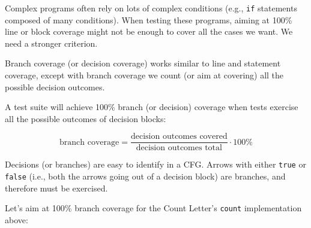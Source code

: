 Complex programs often rely on lots of complex conditions (e.g.,
\texttt{if} statements composed of many conditions). When testing these
programs, aiming at 100\% line or block coverage might not be enough to
cover all the cases we want. We need a stronger criterion.

Branch coverage (or decision coverage) works similar to line and
statement coverage, except with branch coverage we count (or aim at
covering) all the possible decision outcomes.

A test suite will achieve 100\% branch (or decision) coverage when tests
exercise all the possible outcomes of decision blocks:

\[\text{branch coverage} = \frac{\text{decision outcomes covered}}{\text{decision outcomes total}} \cdot 100\%\]

Decisions (or branches) are easy to identify in a CFG. Arrows with
either \texttt{true} or \texttt{false} (i.e., both the arrows going out
of a decision block) are branches, and therefore must be exercised.

Let's aim at 100\% branch coverage for the Count Letter's \texttt{count}
implementation above:

\begin{Shaded}
\begin{Highlighting}[]
 
   \NormalTok{() \{}

     \NormalTok{()}
\NormalTok{(}\NormalTok{);}

    \NormalTok{(}
\NormalTok{  \}}

   \NormalTok{() \{}

     \NormalTok{()}
\NormalTok{(}\NormalTok{);}

    \NormalTok{(}
\NormalTok{  \}}
\NormalTok{\}}
\end{Highlighting}
\end{Shaded}

